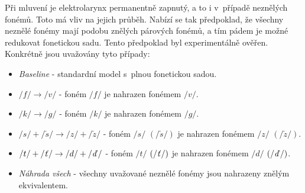 Při mluvení je elektrolarynx permanentně zapnutý, a to i v~případě neznělých fonémů.
Toto má vliv na jejich průběh.
Nabízí se tak předpoklad, že všechny neznělé fonémy mají podobu znělých párových fonémů, a tím pádem je možné redukovat fonetickou sadu. Tento předpoklad byl experimentálně ověřen. Konkrétně jsou uvažovány tyto případy:


\begin{itemize}
  \item \textit{Baseline} - standardní model s~plnou fonetickou sadou.
  \item $/f/ \rightarrow /v/$ - foném $/f/$ je nahrazen fonémem $/v/$.
  \item $/k/ \rightarrow /g/$ - foném $/k/$ je nahrazen fonémem $/g/$.
  \item $/s/+/\check{s}/ \rightarrow /z/+/\check{z}/$ - foném $/s/$ $\left(/\check{s}/\right)$ je nahrazen fonémem $/z/$ $\left(/\check{z}/\right)$.
  \item $/t/+/\text{\textit{ť}}/ \rightarrow /d/+/\text{\textit{ď}}/$ - foném $/t/$ $\left(/\text{\textit{ť}}/\right)$ je nahrazen fonémem $/d/$ $\left(/\text{\textit{ď}}/\right)$.
  \item \textit{Náhrada všech} - všechny uvažované neznělé fonémy jsou nahrazeny znělým ekvivalentem.
\end{itemize}


